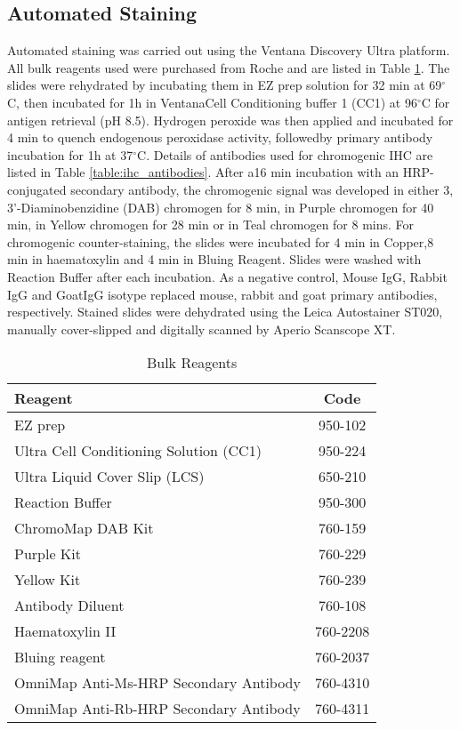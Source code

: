 \subsection{Automated Staining}
Automated staining was carried out using the Ventana Discovery Ultra platform.  All bulk reagents used were purchased from Roche and are listed in Table \ref{table:bulk_reagents}. The slides were rehydrated by incubating them in EZ prep solution for 32 min at 69${^\circ}$C, then incubated for 1h in VentanaCell Conditioning buffer 1 (CC1) at 96${^\circ}$C for antigen retrieval (pH 8.5). Hydrogen peroxide was then applied and incubated for 4 min to quench endogenous peroxidase activity, followedby primary antibody incubation for 1h at 37${^\circ}$C. Details of antibodies used for chromogenic IHC are listed in Table \ref{table:ihc_antibodies}.  After a16 min incubation with an HRP-conjugated secondary antibody, the chromogenic signal was developed in either 3, 3’-Diaminobenzidine (DAB) chromogen for 8 min, in Purple chromogen for 40 min, in Yellow chromogen for 28 min or in Teal chromogen for 8 mins. For chromogenic counter-staining, the slides were incubated for 4 min in Copper,8 min in haematoxylin and 4 min in Bluing Reagent. Slides were washed with Reaction Buffer after each incubation. As a negative control, Mouse IgG, Rabbit IgG and GoatIgG isotype replaced mouse, rabbit and goat primary antibodies, respectively. Stained slides were dehydrated using the Leica Autostainer ST020, manually cover-slipped and digitally scanned by Aperio Scanscope XT. 
\begin{table}[]
    \centering
    \begin{tabular}{lc}
    \hline
    Reagent & Code \\
    \hline
    EZ prep & 950-102 \\
    Ultra Cell Conditioning Solution (CC1) & 950-224\\
    Ultra Liquid Cover Slip (LCS) & 650-210 \\
    Reaction Buffer & 950-300 \\
    ChromoMap DAB Kit & 760-159\\
    Purple Kit & 760-229 \\
    Yellow Kit & 760-239 \\
    Antibody Diluent & 760-108\\
    Haematoxylin II & 760-2208\\
    Bluing reagent & 760-2037\\
    OmniMap Anti-Ms-HRP Secondary Antibody    & 760-4310\\
    OmniMap Anti-Rb-HRP Secondary Antibody & 760-4311 \\
    \hline
    \end{tabular}
    \caption{Bulk Reagents}
    \label{table:bulk_reagents}
\end{table}

